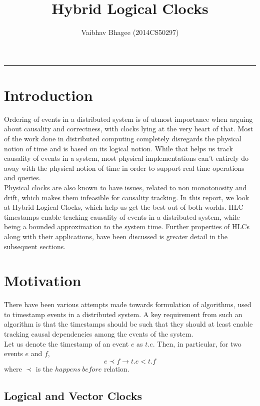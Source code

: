 \documentclass{article}
\title{\textbf{Hybrid Logical Clocks}}
\author{Vaibhav Bhagee (2014CS50297)}
\date{}
\begin{document}
\maketitle

\begin{center}
\noindent\rule{3.2cm}{0.4pt} 
\end{center}

    \section{Introduction}

    Ordering of events in a distributed system is of utmost importance when arguing about causality and correctness, with clocks lying at the very heart of that. Most of the work done in distributed computing completely disregards the physical notion of time and is based on its logical notion. While that helps us track causality of events in a system, most physical implementations can't entirely do away with the physical notion of time in order to support real time operations and queries. \\

    Physical clocks are also known to have issues, related to non monotonosity and drift, which makes them infeasible for causality tracking. In this report, we look at Hybrid Logical Clocks\cite{hlc}, which help us get the best out of both worlds. HLC timestamps enable tracking causality of events in a distributed system, while being a bounded approximation to the system time. Further properties of HLCs along with their applications, have been discussed is greater detail in the subsequent sections.

    \section{Motivation}

    There have been various attempts made towards formulation of algorithms, used to timestamp events in a distributed system. A key requirement from such an algorithm is that the timestamps should be such that they should at least enable tracking causal dependencies among the events of the system. \\

    Let us denote the timestamp of an event $e$ as $t.e$. Then, in particular, for two events $e$ and $f$, $$e \prec f \rightarrow t.e < t.f$$ where $\prec$ is the $happens\ before$ relation.

    \subsection{Logical and Vector Clocks}
\end{document}

